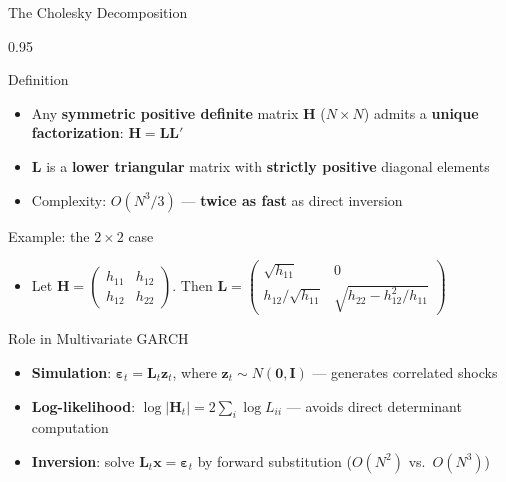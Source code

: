 \documentclass[9pt, aspectratio=169, t]{beamer}
\begin{document}
\begin{frame}{The Cholesky Decomposition}
    \begin{cminipage}{0.95\textwidth}
    \vspace{-2mm}
    {\scriptsize
    \begin{block}{Definition}
        \begin{itemize}\setlength{\itemsep}{0pt}
            \item Any \textbf{symmetric positive definite} matrix $\mathbf{H}$ ($N \times N$) admits a \textbf{unique factorization}: $\mathbf{H} = \mathbf{L}\mathbf{L}'$
            \item $\mathbf{L}$ is a \textbf{lower triangular} matrix with \textbf{strictly positive} diagonal elements
            \item Complexity: $O(N^3/3)$ --- \textbf{twice as fast} as direct inversion
        \end{itemize}
    \end{block}
    \vspace{-1mm}
    \begin{block}{Example: the $2 \times 2$ case}
        \begin{itemize}\setlength{\itemsep}{0pt}
            \item Let $\mathbf{H} = \begin{pmatrix} h_{11} & h_{12} \\ h_{12} & h_{22} \end{pmatrix}$. Then $\mathbf{L} = \begin{pmatrix} \sqrt{h_{11}} & 0 \\ h_{12}/\sqrt{h_{11}} & \sqrt{h_{22} - h_{12}^2/h_{11}} \end{pmatrix}$
        \end{itemize}
    \end{block}
    \vspace{-1mm}
    \begin{alertblock}{Role in Multivariate GARCH}
        \begin{itemize}\setlength{\itemsep}{0pt}
            \item \textbf{Simulation}: $\boldsymbol{\varepsilon}_t = \mathbf{L}_t \mathbf{z}_t$, where $\mathbf{z}_t \sim N(\mathbf{0}, \mathbf{I})$ --- generates correlated shocks
            \item \textbf{Log-likelihood}: $\log|\mathbf{H}_t| = 2\sum_i \log L_{ii}$ --- avoids direct determinant computation
            \item \textbf{Inversion}: solve $\mathbf{L}_t \mathbf{x} = \boldsymbol{\varepsilon}_t$ by forward substitution ($O(N^2)$ vs.\ $O(N^3)$)
        \end{itemize}
    \end{alertblock}
    }
    \end{cminipage}
\end{frame}
\end{document}
